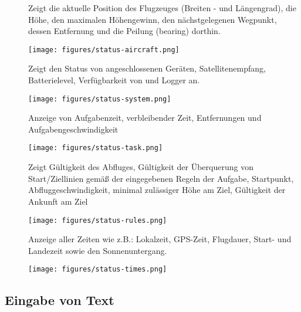 \begin{description}
\item[] Zeigt die aktuelle Position des Flugzeuges (Breiten - und Längengrad), die Höhe, den maximalen Höhengewinn, den nächstgelegenen Wegpunkt, dessen Entfernung  und die Peilung (bearing) dorthin.
\begin{center}

\texttt{[image: figures/status-aircraft.png]}
\end{center}

\item[] Zeigt den Status von angeschlossenen Geräten, Satellitenempfang,  Batterielevel, Verfügbarkeit von \fl und  Logger an. 

\begin{center}
\texttt{[image: figures/status-system.png]}
\end{center}

\item[] Anzeige von Aufgabenzeit, verbleibender Zeit, Entfernungen und Aufgabengeschwindigkeit
\begin{center}
\texttt{[image: figures/status-task.png]}
\end{center}

\item[] Zeigt Gültigkeit des Abfluges, Gültigkeit der Überquerung von Start/Ziellinien gemäß der eingegebenen Regeln der Aufgabe, Startpunkt, Abfluggeschwindigkeit, minimal zulässiger Höhe am Ziel, Gültigkeit der Ankunft am Ziel
\begin{center}
\texttt{[image: figures/status-rules.png]}
\end{center}

\item[] Anzeige aller Zeiten wie z.B.: Lokalzeit, GPS-Zeit, Flugdauer, Start-  und Landezeit sowie den Sonnenuntergang.
\begin{center}
\texttt{[image: figures/status-times.png]}
\end{center}
\end{description}

\subsection*{Eingabe von Text} \label{sec:textentry}




